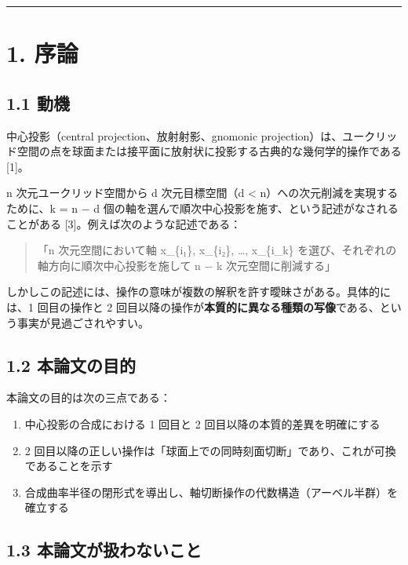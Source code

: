 \documentclass[a4paper,11pt]{ltjsarticle}
\theoremstyle{definition}
\theoremstyle{remark}
\providecommand{\tightlist}{%
  \setlength{\itemsep}{0pt}\setlength{\parskip}{0pt}}
\begin{document}
\begin{center}\rule{0.5\linewidth}{0.5pt}\end{center}

\section{1. 序論}\label{ux5e8fux8ad6}

\subsection{1.1 動機}\label{ux52d5ux6a5f}

中心投影（central projection、放射射影、gnomonic
projection）は、ユークリッド空間の点を球面または接平面に放射状に投影する古典的な幾何学的操作である
{[}1{]}。

n 次元ユークリッド空間から d 次元目標空間（d \textless{}
n）への次元削減を実現するために、k = n − d
個の軸を選んで順次中心投影を施す、という記述がなされることがある
{[}3{]}。例えば次のような記述である：

\begin{quote}
「n 次元空間において軸 x\_\{i₁\}, x\_\{i₂\}, \ldots, x\_\{i\_k\}
を選び、それぞれの軸方向に順次中心投影を施して n − k
次元空間に削減する」
\end{quote}

しかしこの記述には、操作の意味が複数の解釈を許す曖昧さがある。具体的には、1
回目の操作と 2
回目以降の操作が\textbf{本質的に異なる種類の写像}である、という事実が見過ごされやすい。

\subsection{1.2
本論文の目的}\label{ux672cux8ad6ux6587ux306eux76eeux7684}

本論文の目的は次の三点である：

\begin{enumerate}
\def\labelenumi{\arabic{enumi}.}
\tightlist
\item
  中心投影の合成における 1 回目と 2 回目以降の本質的差異を明確にする
\item
  2
  回目以降の正しい操作は「球面上での同時刻面切断」であり、これが可換であることを示す
\item
  合成曲率半径の閉形式を導出し、軸切断操作の代数構造（アーベル半群）を確立する
\end{enumerate}

\subsection{1.3
本論文が扱わないこと}\label{ux672cux8ad6ux6587ux304cux6271ux308fux306aux3044ux3053ux3068}
\end{document}
